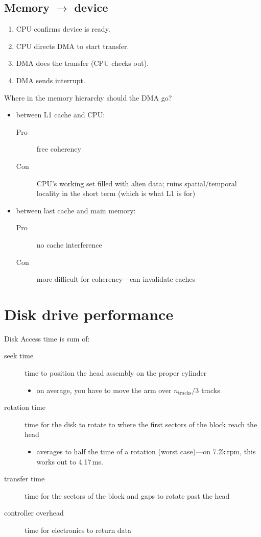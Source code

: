 \subsection{Memory \(\to\) device}
\begin{enumerate}
	\item CPU confirms device is ready.
	\item CPU directs DMA to start transfer.
	\item DMA does the transfer (CPU checks out).
	\item DMA sends interrupt.
\end{enumerate}

Where in the memory hierarchy should the DMA go?
\begin{itemize}
	\item between L1 cache and CPU:
	\begin{description}
		\item[Pro] free coherency
		\item[Con] CPU's working set filled with alien data; ruins spatial/temporal locality in the short term (which is what L1 is for)
	\end{description}
	\item between last cache and main memory:
	\begin{description}
		\item[Pro] no cache interference
		\item[Con] more difficult for coherency---can invalidate caches
	\end{description}
\end{itemize}

\section{Disk drive performance}
Disk Access time is sum of:
\begin{description}
	\item[seek time] time to position the head assembly on the proper cylinder
	\begin{itemize}
		\item on average, you have to move the arm over \(n_\text{tracks}/3\) tracks
	\end{itemize}
	\item[rotation time] time for the disk to rotate to where the first sectors of the block reach the head
	\begin{itemize}
		\item averages to half the time of a rotation (worst case)---on 7.2k\,rpm, this works out to 4.17\,ms.
	\end{itemize}
	\item[transfer time] time for the sectors of the block and gaps to rotate past the head
	\item[controller overhead] time for electronics to return data
\end{description}

